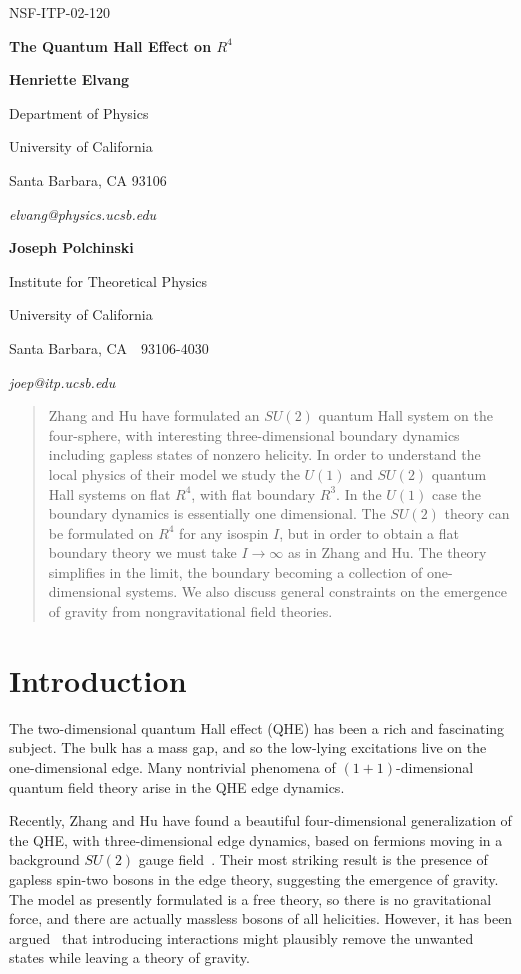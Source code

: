 \documentclass[a4paper,12pt]{article}
\newcommand{\R}{R}
\newcommand{\sect}[1]{\section{#1}\setcounter{equation}{0}}
\begin{document}
\bigskip
\hskip 5in\vbox{\baselineskip12pt
\hbox{NSF-ITP-02-120}
}
\bigskip\bigskip

\centerline{\Large \bf The Quantum Hall Effect on $R^4$
}
\bigskip
\centerline{\bf Henriette Elvang}
\medskip
\centerline{Department of Physics}
\centerline{University of California}
\centerline{Santa Barbara, CA 93106}
\centerline{\it elvang@physics.ucsb.edu}
\bigskip
\centerline{\bf Joseph Polchinski}
\medskip
\centerline{Institute for Theoretical Physics}
\centerline{University of California}
\centerline{Santa Barbara, CA\ \ 93106-4030}
\centerline{\it joep@itp.ucsb.edu}


\begin{abstract}
Zhang and Hu have formulated an $SU(2)$ quantum Hall system on the
four-sphere, with interesting three-dimensional boundary dynamics including
gapless states of nonzero helicity.  In order to understand the local physics
of their model we study the
$U(1)$ and
$SU(2)$ quantum Hall systems on flat $\R^4$, with flat boundary $\R^3$.  In the
$U(1)$ case the boundary dynamics is essentially one dimensional.  The $SU(2)$
theory can be formulated on $\R^4$ for any isospin $I$, but in order to obtain
a flat boundary theory we must take $I \to \infty$ as in Zhang and Hu.  The
theory simplifies in the limit, the boundary becoming a collection of
one-dimensional systems.  We also discuss general constraints on the emergence
of gravity from nongravitational field theories.


\end{abstract}

\newpage
\baselineskip=18pt

\sect{Introduction}

The two-dimensional quantum Hall effect (QHE) has been a rich and
fascinating subject.  The bulk has a mass gap, and so the
low-lying excitations live on the one-dimensional edge.  Many nontrivial
phenomena of $(1+1)$-dimensional quantum field theory arise in the QHE edge
dynamics.

Recently, Zhang and Hu have found a beautiful four-dimensional
generalization of the QHE, with three-dimensional edge
dynamics, based on fermions moving in a background $SU(2)$ gauge
field~\cite{hz1,hz2}.   Their most striking result is the presence of
gapless spin-two bosons in the edge theory, suggesting the
emergence of gravity.  The model as presently formulated
is a free theory, so there is no gravitational force, and there are
actually massless bosons of all helicities.  However, it has been
argued~\cite{hz1} that introducing interactions might plausibly remove the
unwanted states while leaving a theory of gravity.
\end{document}
